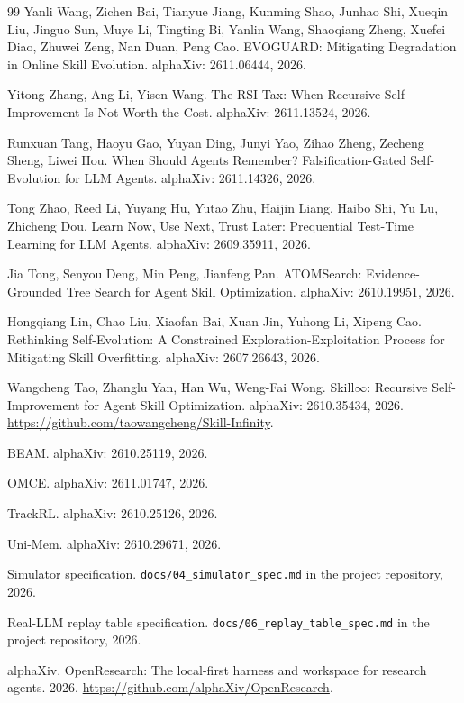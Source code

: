 \documentclass[11pt]{article}
\begin{document}
\begin{thebibliography}{99}
 Yanli Wang, Zichen Bai, Tianyue Jiang, Kunming Shao, Junhao Shi, Xueqin Liu, Jinguo Sun, Muye Li, Tingting Bi, Yanlin Wang, Shaoqiang Zheng, Xuefei Diao, Zhuwei Zeng, Nan Duan, Peng Cao. EVOGUARD: Mitigating Degradation in Online Skill Evolution. alphaXiv: 2611.06444, 2026.

 Yitong Zhang, Ang Li, Yisen Wang. The RSI Tax: When Recursive Self-Improvement Is Not Worth the Cost. alphaXiv: 2611.13524, 2026.

 Runxuan Tang, Haoyu Gao, Yuyan Ding, Junyi Yao, Zihao Zheng, Zecheng Sheng, Liwei Hou. When Should Agents Remember? Falsification-Gated Self-Evolution for LLM Agents. alphaXiv: 2611.14326, 2026.

 Tong Zhao, Reed Li, Yuyang Hu, Yutao Zhu, Haijin Liang, Haibo Shi, Yu Lu, Zhicheng Dou. Learn Now, Use Next, Trust Later: Prequential Test-Time Learning for LLM Agents. alphaXiv: 2609.35911, 2026.

 Jia Tong, Senyou Deng, Min Peng, Jianfeng Pan. ATOMSearch: Evidence-Grounded Tree Search for Agent Skill Optimization. alphaXiv: 2610.19951, 2026.

 Hongqiang Lin, Chao Liu, Xiaofan Bai, Xuan Jin, Yuhong Li, Xipeng Cao. Rethinking Self-Evolution: A Constrained Exploration-Exploitation Process for Mitigating Skill Overfitting. alphaXiv: 2607.26643, 2026.

 Wangcheng Tao, Zhanglu Yan, Han Wu, Weng-Fai Wong. Skill$\infty$: Recursive Self-Improvement for Agent Skill Optimization. alphaXiv: 2610.35434, 2026. \url{https://github.com/taowangcheng/Skill-Infinity}.

 BEAM. alphaXiv: 2610.25119, 2026.

 OMCE. alphaXiv: 2611.01747, 2026.

 TrackRL. alphaXiv: 2610.25126, 2026.

 Uni-Mem. alphaXiv: 2610.29671, 2026.

 Simulator specification. \texttt{docs/04\_simulator\_spec.md} in the project repository, 2026.

 Real-LLM replay table specification. \texttt{docs/06\_replay\_table\_spec.md} in the project repository, 2026.

 alphaXiv. OpenResearch: The local-first harness and workspace for research agents. 2026. \url{https://github.com/alphaXiv/OpenResearch}.
\end{thebibliography}
\end{document}
